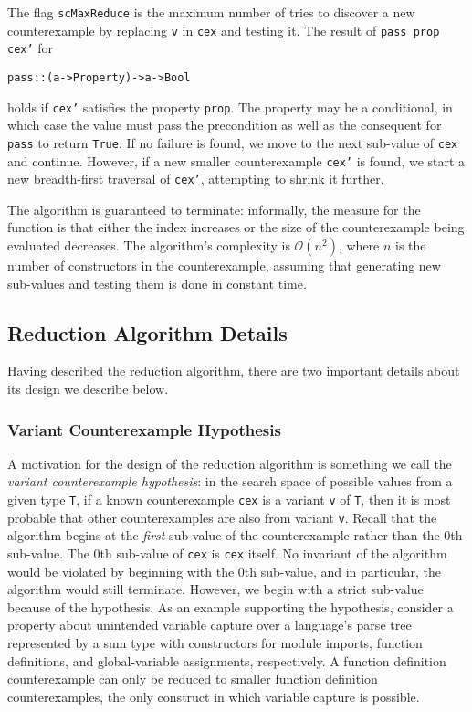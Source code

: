\documentclass{sigplanconf}
\newenvironment{code}{\begin{alltt}\footnotesize}{\end{alltt}}
\newcommand{\ttp}[1]{\texttt{#1}}
\begin{document}
The flag \ttp{scMaxReduce} is the maximum number of tries to discover a new
counterexample by replacing \ttp{v} in \ttp{cex} and testing it.  The result of
\ttp{pass prop cex'} for
%
\begin{code}
pass :: (a -> Property) -> a -> Bool
\end{code}
%
\noindent
holds if \ttp{cex'} satisfies the property \ttp{prop}.  The property may be a
conditional, in which case the value must pass the precondition as well as the
consequent for \ttp{pass} to return \ttp{True}.  If no failure is found, we move
to the next sub-value of \ttp{cex} and continue.  However, if a new smaller
counterexample \ttp{cex'} is found, we start a new breadth-first traversal of
\ttp{cex'}, attempting to shrink it further.

The algorithm is guaranteed to terminate: informally, the measure for the
function is that either the index increases or the size of the counterexample
being evaluated decreases.  The algorithm's complexity is
$\mathcal{O}(n^2)$, where $n$ is the number of constructors in the
counterexample, assuming that generating new sub-values and testing them is done
in constant time.

\subsection{Reduction Algorithm Details}\label{sec:details}
Having described the reduction algorithm, there are two important details about
its design we describe below.

\subsubsection{Variant Counterexample Hypothesis}
A motivation for the design of the reduction algorithm is something we call the
\emph{variant counterexample hypothesis}: in the search space of possible values
from a given type \ttp{T}, if a known counterexample \ttp{cex} is a variant
\ttp{v} of \ttp{T}, then it is most probable that other counterexamples are also
from variant \ttp{v}.  Recall that the algorithm begins at the \emph{first}
sub-value of the counterexample rather than the 0th sub-value.  The 0th
sub-value of \ttp{cex} is \ttp{cex} itself.  No invariant of the algorithm would
be violated by beginning with the 0th sub-value, and in particular, the
algorithm would still terminate.  However, we begin with a strict sub-value
because of the hypothesis.  As an example supporting the hypothesis, consider a
property about unintended variable capture over a language's parse tree
represented by a sum type with constructors for module imports, function
definitions, and global-variable assignments, respectively.  A function
definition counterexample can only be reduced to smaller function definition
counterexamples, the only construct in which variable capture is possible.
\end{document}
